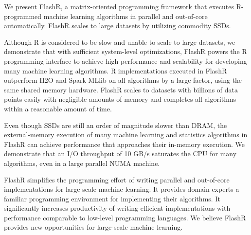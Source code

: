 We present FlashR, a matrix-oriented programming framework that executes
R-programmed machine learning algorithms in parallel and out-of-core
automatically. FlashR scales to large datasets by utilizing commodity SSDs.


Although R is considered to be slow and unable to scale to large datasets,
we demonstrate that with sufficient system-level optimizations, FlashR powers
the R programming interface to achieve high performance and scalability
for developing many machine learning algorithms. R implementations executed in FlashR
outperform H2O and Spark MLlib on all algorithms by a large factor, using
the same shared memory hardware. FlashR scales to datasets with billions of
data points easily with negligible amounts of memory and completes all
algorithms within a reasonable amount of time.

Even though SSDs are still an order of magnitude slower than DRAM, the external-memory
execution of many machine learning and statistics algorithms in FlashR can achieve performance
that approaches their in-memory execution. We demonstrate that an I/O throughput
of 10 GB/s saturates the CPU for many algorithms, even in a large parallel
NUMA machine. 

FlashR simplifies the programming effort of writing
parallel and out-of-core implementations for large-scale machine learning. It
provides domain experts a familiar programming environment for implementing
their algorithms. It significantly
increases productivity of writing efficient implementations with performance
comparable to low-level programming languages. We believe FlashR provides
new opportunities for large-scale machine learning.

